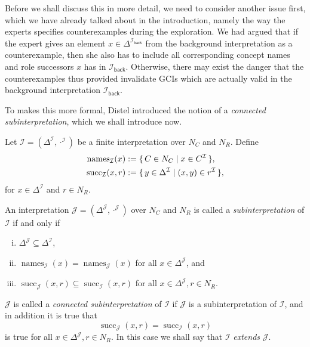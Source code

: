 Before we shall discuss this in more detail, we need to consider another issue first,
which we have already talked about in the introduction, namely the way the experts
specifies counterexamples during the exploration.  We had argued that if the expert gives
an element $x \in \Delta^{\mathcal{I}_{\mathsf{back}}}$ from the background interpretation
as a counterexample, then she also has to include all corresponding concept names and role
successors $x$ has in $\mathcal{I}_{\mathsf{back}}$.  Otherwise, there may exist the
danger that the counterexamples thus provided invalidate GCIs which are actually valid in
the background interpretation $\mathcal{I}_{\mathsf{back}}$.

To makes this more formal, Distel introduced the notion of a \emph{connected
  subinterpretation}, which we shall introduce now.

\begin{Definition}
  \label{def:connected-subinterpretations}
  Let $\mathcal{I} = (\Delta^{\mathcal{I}}, \cdot^{\mathcal{I}})$ be a finite
  interpretation over $N_{C}$ and $N_{R}$.  Define%
  \def\succop{\operatorname{succ}}%
  \def\nameop{\operatorname{names}}%
  \begin{align*}
    \nameop_{\mathcal{I}}(x) &:= \set{ C \in N_{C} \mid x \in C^{\mathcal{I}} },\\
    \succop_{\mathcal{I}}(x, r) &:= \set{ y \in \Delta^{\mathcal{I}} \mid (x, y) \in
      r^{\mathcal{I}} },
  \end{align*}
  for $x \in \Delta^{\mathcal{I}}$ and $r \in N_{R}$.

  An interpretation $\mathcal{J} = (\Delta^{\mathcal{J}}, \cdot^{\mathcal{J}})$ over
  $N_{C}$ and $N_{R}$ is called a \emph{subinterpretation} of $\mathcal{I}$ if and only if
  \begin{enumerate}[i. ]
  \item $\Delta^{\mathcal{J}} \subseteq \Delta^{\mathcal{I}}$,
  \item $\nameop_{\mathcal{I}}(x) = \nameop_{\mathcal{J}}(x)$ for all $x \in
    \Delta^{\mathcal{J}}$, and
  \item $\succop_{\mathcal{J}}(x,r) \subseteq \succop_{\mathcal{I}}(x,r)$ for all $x \in
    \Delta^{\mathcal{J}}, r \in N_{R}$.
  \end{enumerate}
  $\mathcal{J}$ is called a \emph{connected subinterpretation} of $\mathcal{I}$ if
  $\mathcal{J}$ is a subinterpretation of $\mathcal{I}$, and in addition it is true that
  \begin{equation*}
    \succop_{\mathcal{J}}(x, r) = \succop_{\mathcal{I}}(x, r)
  \end{equation*}
  is true for all $x \in \Delta^{\mathcal{J}}, r \in N_{R}$.  In this case we shall say
  that $\mathcal{I}$ \emph{extends} $\mathcal{J}$.
\end{Definition}

